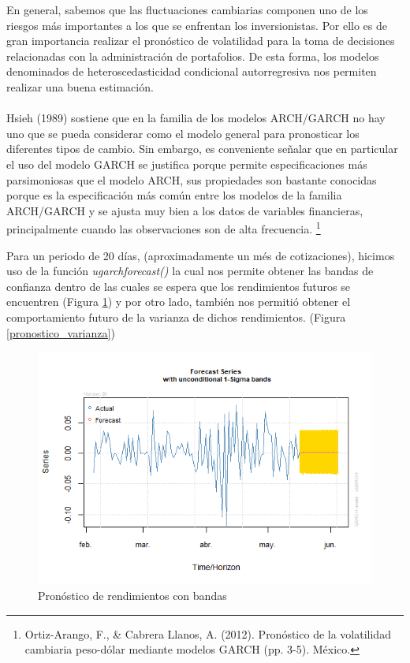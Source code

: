 En general, sabemos que las fluctuaciones cambiarias componen uno de los riesgos más importantes a los que se enfrentan los inversionistas. Por ello es de gran importancia realizar el pronóstico de volatilidad para la toma de decisiones relacionadas con la administración de portafolios. De esta forma, los modelos denominados de heteroscedasticidad condicional autorregresiva nos permiten realizar una buena estimación. 
\\\\
Hsieh (1989) sostiene que en la familia de los modelos ARCH/GARCH no hay uno que se
pueda considerar como el modelo general para pronosticar los diferentes tipos de cambio.
Sin embargo, es conveniente señalar que en particular el uso del modelo GARCH se
justifica porque permite especificaciones más parsimoniosas que el modelo ARCH, sus propiedades son bastante conocidas porque es la especificación más común entre los modelos de la familia ARCH/GARCH y se ajusta muy bien a los datos de variables financieras, principalmente
cuando las observaciones son de alta frecuencia. \footnote{Ortiz-Arango, F., \& Cabrera Llanos, A. (2012). Pronóstico de la volatilidad cambiaria peso-dólar mediante modelos GARCH (pp. 3-5). México.}

 Para un periodo de 20 días, (aproximadamente un més de cotizaciones), hicimos uso de la función \textit{ugarchforecast()} la cual nos permite obtener las bandas de confianza dentro de las cuales se espera que  los rendimientos futuros se encuentren (Figura \ref{pronostico_serie}) y por otro lado, también nos permitió obtener el comportamiento futuro de la varianza de dichos rendimientos. (Figura \ref{pronostico_varianza})
\begin{figure}[!ht]
    \centering
    \includegraphics[scale=.8]{Graficos/pronostico_serie_20dias.png}
    \caption{Pronóstico de rendimientos con bandas}
    \label{pronostico_serie}
\end{figure}

